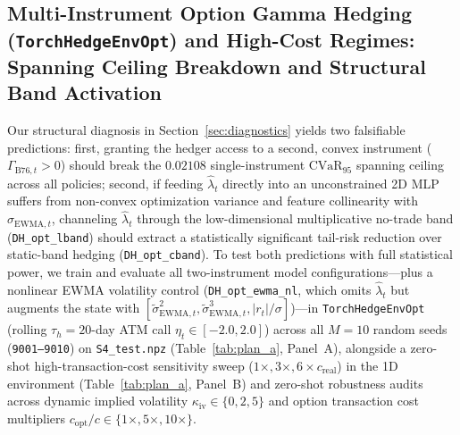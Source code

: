 \documentclass[11pt,a4paper]{article}
\begin{document}
\subsection{Multi-Instrument Option Gamma Hedging (\texttt{TorchHedgeEnvOpt}) and High-Cost Regimes: Spanning Ceiling Breakdown and Structural Band Activation}
\label{sec:plan_a}
Our structural diagnosis in Section~\ref{sec:diagnostics} yields two falsifiable predictions: first, granting the hedger access to a second, convex instrument ($\Gamma_{\text{B76},t} > 0$) should break the $0.02108$ single-instrument $\text{CVaR}_{95}$ spanning ceiling across all policies; second, if feeding $\hat{\lambda}_t$ directly into an unconstrained 2D MLP suffers from non-convex optimization variance and feature collinearity with $\sigma_{\text{EWMA},t}$, channeling $\hat{\lambda}_t$ through the low-dimensional multiplicative no-trade band (\texttt{DH\_opt\_lband}) should extract a statistically significant tail-risk reduction over static-band hedging (\texttt{DH\_opt\_cband}). To test both predictions with full statistical power, we train and evaluate all two-instrument model configurations---plus a nonlinear EWMA volatility control (\texttt{DH\_opt\_ewma\_nl}, which omits $\hat{\lambda}_t$ but augments the state with $[\tilde{\sigma}_{\text{EWMA},t}^2, \tilde{\sigma}_{\text{EWMA},t}^3, |r_t|/\sigma]$)---in \texttt{TorchHedgeEnvOpt} (rolling $\tau_h = 20$-day ATM call $\eta_t \in [-2.0, 2.0]$) across all $M = 10$ random seeds (\texttt{9001--9010}) on \texttt{S4\_test.npz} (Table~\ref{tab:plan_a}, Panel~A), alongside a zero-shot high-transaction-cost sensitivity sweep ($1\times, 3\times, 6\times c_{\text{real}}$) in the 1D environment (Table~\ref{tab:plan_a}, Panel~B) and zero-shot robustness audits across dynamic implied volatility $\kappa_{\text{iv}} \in \{0, 2, 5\}$ and option transaction cost multipliers $c_{\text{opt}}/c \in \{1\times, 5\times, 10\times\}$.
\end{document}
